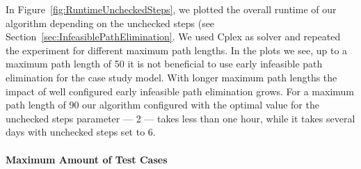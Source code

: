 \documentclass[runningheads,a4paper]{llncs}%
\begin{document}
In Figure~\ref{fig:RuntimeUncheckedSteps}, we plotted the overall runtime of our
algorithm depending on the unchecked steps (see
Section~\ref{sec:InfeasiblePathElimination}. We used Cplex as solver and
repeated the experiment for different maximum path lengths. In the plots we see,
up to a maximum path length of 50 it is not beneficial to use early infeasible
path elimination for the case study model. With longer maximum path lengths the
impact of well configured early infeasible path elimination grows. For a maximum
path length of 90 our algorithm configured with the optimal value for the
unchecked steps parameter --- 2 --- takes less than one hour, while it takes
several days with unchecked steps set to 6.%
%
\paragraph{Maximum Amount of Test Cases}
\end{document}
